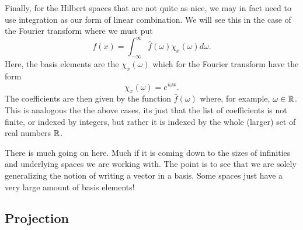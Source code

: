 Finally, for the Hilbert spaces that are not quite as nice, we may in fact need to use integration as our form of linear combination.  We will see this in the case of the Fourier transform where we must put
\[
f(x)=\int_{-\infty}^\infty \hat{f}(\omega) \chi_x(\omega)d\omega.
\]
Here, the basis elements are the $\chi_x(\omega)$ which for the Fourier transform have the form
\[
\chi_x(\omega) = e^{i\omega x}.
\]
The coefficients are then given by the function $\hat{f}(\omega)$ where, for example, $\omega \in \mathbb{R}$. This is analogous the the above cases, its just that the list of coefficients is not finite, or indexed by integers, but rather it is indexed by the whole (larger) set of real numbers $\mathbb{R}$.  

\begin{remark}
	There is much going on here. Much if it is coming down to the sizes of infinities and underlying spaces we are working with.  The point is to see that we are solely generalizing the notion of writing a vector in a basis. Some spaces just have a very large amount of basis elements!	
\end{remark}

\subsection{Projection}

